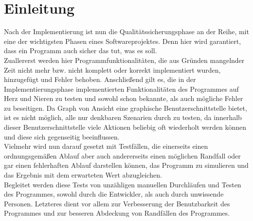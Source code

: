 \chapter{Einleitung}
\label{ch:einleitung}

Nach der Implementierung ist nun die Qualitätssicherungsphase an der Reihe, mit eine der wichtigsten Phasen eines Softwareprojektes. Denn hier wird garantiert, dass ein Programm auch sicher das tut, was es soll. \\
Zuallererst werden hier Programmfunktionalitäten, die aus Gründen mangelnder Zeit nicht mehr bzw. nicht komplett oder korrekt implementiert wurden, hinzugefügt und Fehler behoben.
Anschließend gilt es, die in der Implementierungsphase implementierten Funktionalitäten des Programmes auf Herz und Nieren zu testen und sowohl schon bekannte, als auch mögliche Fehler zu beseitigen.
Da Graph von Ansicht eine graphische Benutzerschnittstelle bietet, ist es nicht möglich, alle nur denkbaren Szenarien durch zu testen, da innerhalb dieser Benutzerschnittstelle viele Aktionen beliebig oft wiederholt werden können und diese sich gegenseitig beeinflussen.\\
Vielmehr wird nun darauf gesetzt mit Testfällen, die einerseits einen ordnungsgemäßen Ablauf aber auch andererseits einen möglichen Randfall oder gar einen fehlerhaften Ablauf darstellen können, das Programm zu simulieren und das Ergebnis mit dem erwarteten Wert abzugleichen.\\
Begleitet werden diese Tests von unzähligen manuellen Durchläufen und Testen des Programmes, sowohl durch die Entwickler, als auch durch unwissende Personen. Letzteres dient vor allem zur Verbesserung der Benutzbarkeit des Programmes und zur besseren Abdeckung von Randfällen des Programmes.\\